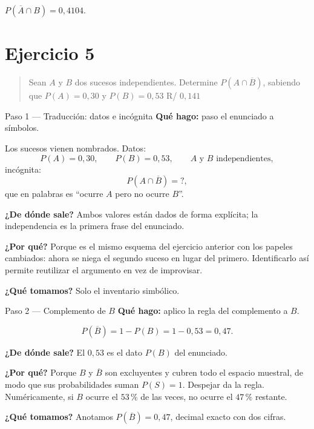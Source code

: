 \documentclass[11pt]{article}
\begin{document}
\begin{resp}
$P(\overline{A}\cap B)=0{,}4104$.
\end{resp}

\section*{Ejercicio 5}

\begin{quote}
Sean $A$ y $B$ dos sucesos independientes. Determine $P(A \cap \overline{B})$, sabiendo que $P(A) = 0{,}30$ y $P(B) = 0{,}53$ \hfill R/ $0{,}141$
\end{quote}

\begin{paso}{Paso 1 --- Traducción: datos e incógnita}
\textbf{Qué hago:} paso el enunciado a símbolos.

Los sucesos vienen nombrados. Datos:
\[
P(A)=0{,}30,\qquad P(B)=0{,}53,\qquad A \text{ y } B \text{ independientes},
\]
incógnita:
\[
P(A\cap\overline{B})=?,
\]
que en palabras es ``ocurre $A$ pero no ocurre $B$''.

\textbf{¿De dónde sale?} Ambos valores están dados de forma explícita; la independencia es la primera frase del enunciado.

\textbf{¿Por qué?} Porque es el mismo esquema del ejercicio anterior con los papeles cambiados: ahora se niega el segundo suceso en lugar del primero. Identificarlo así permite reutilizar el argumento en vez de improvisar.

\textbf{¿Qué tomamos?} Solo el inventario simbólico.
\end{paso}

\begin{paso}{Paso 2 --- Complemento de $B$}
\textbf{Qué hago:} aplico la regla del complemento a $B$.

\[
P(\overline{B})=1-P(B)=1-0{,}53=0{,}47.
\]

\textbf{¿De dónde sale?} El $0{,}53$ es el dato $P(B)$ del enunciado.

\textbf{¿Por qué?} Porque $B$ y $\overline{B}$ son excluyentes y cubren todo el espacio muestral, de modo que sus probabilidades suman $P(S)=1$. Despejar da la regla. Numéricamente, si $B$ ocurre el $53\,\%$ de las veces, no ocurre el $47\,\%$ restante.

\textbf{¿Qué tomamos?} Anotamos $P(\overline{B})=0{,}47$, decimal exacto con dos cifras.
\end{paso}
\end{document}
